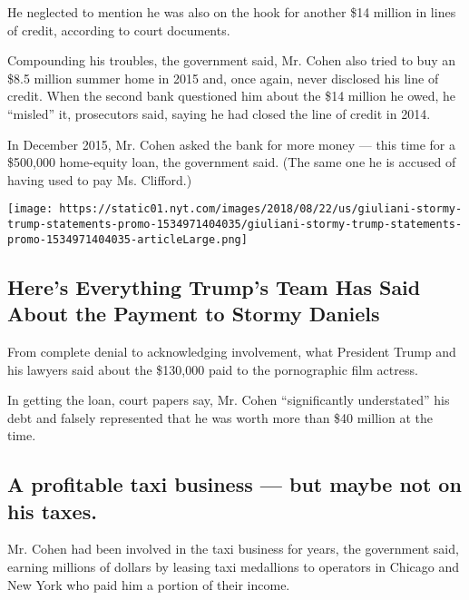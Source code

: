 He neglected to mention he was also on the hook for another \$14 million
in lines of credit, according to court documents.

Compounding his troubles, the government said, Mr. Cohen also tried to
buy an \$8.5 million summer home in 2015 and, once again, never
disclosed his line of credit. When the second bank questioned him about
the \$14 million he owed, he ``misled'' it, prosecutors said, saying he
had closed the line of credit in 2014.

In December 2015, Mr. Cohen asked the bank for more money --- this time
for a \$500,000 home-equity loan, the government said. (The same one he
is accused of having used to pay Ms. Clifford.)

\href{https://www.nytimes.com/interactive/2018/05/03/us/politics/giuliani-stormy-trump-statements.html}{}

\texttt{[image: https://static01.nyt.com/images/2018/08/22/us/giuliani-stormy-trump-statements-promo-1534971404035/giuliani-stormy-trump-statements-promo-1534971404035-articleLarge.png]}

\hypertarget{heres-everything-trumps-team-has-said-about-the-payment-to-stormy-daniels}{%
\subsection{Here's Everything Trump's Team Has Said About the Payment to
Stormy
Daniels}\label{heres-everything-trumps-team-has-said-about-the-payment-to-stormy-daniels}}

From complete denial to acknowledging involvement, what President Trump
and his lawyers said about the \$130,000 paid to the pornographic film
actress.

In getting the loan, court papers say, Mr. Cohen ``significantly
understated'' his debt and falsely represented that he was worth more
than \$40 million at the time.

\hypertarget{a-profitable-taxi-business--but-maybe-not-on-his-taxes}{%
\subsection{A profitable taxi business --- but maybe not on his
taxes.}\label{a-profitable-taxi-business--but-maybe-not-on-his-taxes}}

Mr. Cohen had been involved in the taxi business for years, the
government said, earning millions of dollars by leasing taxi medallions
to operators in Chicago and New York who paid him a portion of their
income.

